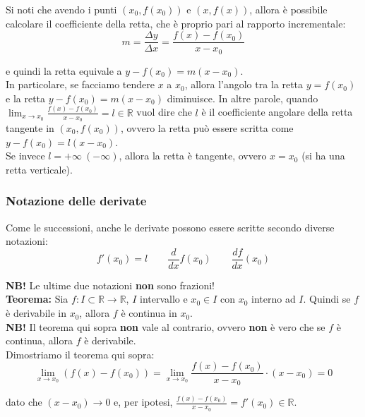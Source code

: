 \documentclass{article}
\begin{document}
\noindent Si noti che avendo i punti $(x_0, f(x_0))$ e $(x, f(x))$, allora è possibile calcolare il coefficiente della retta, che è proprio pari al rapporto incrementale:
\begin{equation*}
    m = \frac{\Delta y}{\Delta x} = \frac{f(x) - f(x_0)}{x - x_0}
\end{equation*}

\noindent e quindi la retta equivale a $y - f(x_0) = m(x - x_0)$.\\
\noindent In particolare, se facciamo tendere $x$ a $x_0$, allora l'angolo tra la retta $y = f(x_0)$ e la retta $y - f(x_0) = m(x - x_0)$ diminuisce. In altre parole, quando $\lim_{x \to x_0} \frac{f(x) - f(x_0)}{x - x_0} = l \in \mathbb{R}$ vuol dire che $l$ è il coefficiente angolare della retta tangente in $(x_0, f(x_0))$, ovvero la retta può essere scritta come $y - f(x_0) = l(x - x_0)$.\\
Se invece $l = +\infty \ (- \infty)$, allora la retta è tangente, ovvero $x = x_0$ (si ha una retta verticale).

\subsubsection{Notazione delle derivate}
Come le successioni, anche le derivate possono essere scritte secondo diverse notazioni:
\begin{equation*}
    f'(x_0) = l \qquad \frac{d}{dx} f(x_0) \qquad \frac{df}{dx} (x_0)
\end{equation*}

\noindent\textbf{NB!} Le ultime due notazioni \textbf{non} sono frazioni!\\

\noindent\textbf{Teorema:} Sia $f: I \subset \mathbb{R} \xrightarrow{} \mathbb{R}$, $I$ intervallo e $x_0 \in I$ con $x_0$ interno ad $I$. Quindi se $f$ è derivabile in $x_0$, allora $f$ è continua in $x_0$.\\

\noindent\textbf{NB!} Il teorema qui sopra \textbf{non} vale al contrario, ovvero \textbf{non} è vero che se $f$ è continua, allora $f$ è derivabile.\\

\noindent Dimostriamo il teorema qui sopra:
\begin{equation*}
    \lim_{x \to x_0} (f(x) - f(x_0)) = \lim_{x \to x_0} \frac{f(x) - f(x_0)}{x - x_0} \cdot (x - x_0) = 0
\end{equation*}

\noindent dato che $(x - x_0) \to 0$ e, per ipotesi, $\frac{f(x) - f(x_0)}{x - x_0} = f'(x_0) \in \mathbb{R}$.\\
\end{document}
